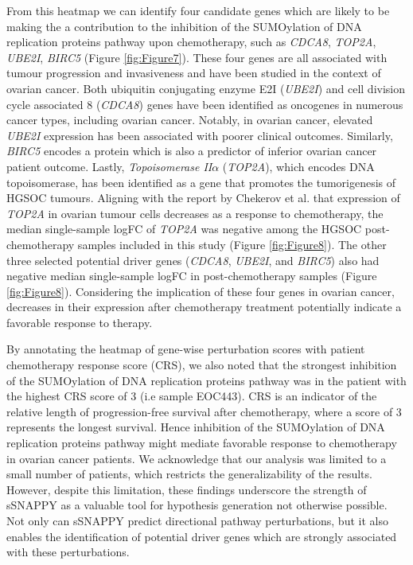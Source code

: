 \documentclass[9pt,a4paper,]{extarticle}
\begin{document}
From this heatmap we can identify four candidate genes which are likely to be making the a contribution to the inhibition of the SUMOylation of DNA replication proteins pathway upon chemotherapy, such as \emph{CDCA8}, \emph{TOP2A}, \emph{UBE2I}, \emph{BIRC5} (Figure \ref{fig:Figure7}).
These four genes are all associated with tumour progression and invasiveness and have been studied in the context of ovarian cancer.
Both ubiquitin conjugating enzyme E2I (\emph{UBE2I}) and cell division cycle associated 8 (\emph{CDCA8}) genes have been identified as oncogenes in numerous cancer types, including ovarian cancer\citep{Dong2013, qi2021}.
Notably, in ovarian cancer, elevated \emph{UBE2I} expression has been associated with poorer clinical outcomes\citep{Zou2020}.
Similarly, \emph{BIRC5} encodes a protein which is also a predictor of inferior ovarian cancer patient outcome\citep{Gasowska-Bajger2021}.
Lastly, \emph{Topoisomerase II}\(\alpha\) (\emph{TOP2A}), which encodes DNA topoisomerase, has been identified as a gene that promotes the tumorigenesis of HGSOC tumours\citep{Gao2020}.
Aligning with the report by Chekerov et al.\citep{Chekerov2006} that expression of \emph{TOP2A} in ovarian tumour cells decreases as a response to chemotherapy\citep{Chekerov2006}, the median single-sample logFC of \emph{TOP2A} was negative among the HGSOC post-chemotherapy samples included in this study (Figure \ref{fig:Figure8}).
The other three selected potential driver genes (\emph{CDCA8}, \emph{UBE2I}, and \emph{BIRC5}) also had negative median single-sample logFC in post-chemotherapy samples (Figure \ref{fig:Figure8}).
Considering the implication of these four genes in ovarian cancer, decreases in their expression after chemotherapy treatment potentially indicate a favorable response to therapy.

By annotating the heatmap of gene-wise perturbation scores with patient chemotherapy response score (CRS), we also noted that the strongest inhibition of the SUMOylation of DNA replication proteins pathway was in the patient with the highest CRS score of 3 (i.e sample EOC443).
CRS is an indicator of the relative length of progression-free survival after chemotherapy, where a score of 3 represents the longest survival.
Hence inhibition of the SUMOylation of DNA replication proteins pathway might mediate favorable response to chemotherapy in ovarian cancer patients.
We acknowledge that our analysis was limited to a small number of patients, which restricts the generalizability of the results.
However, despite this limitation, these findings underscore the strength of sSNAPPY as a valuable tool for hypothesis generation not otherwise possible.
Not only can sSNAPPY predict directional pathway perturbations, but it also enables the identification of potential driver genes which are strongly associated with these perturbations.
\end{document}
